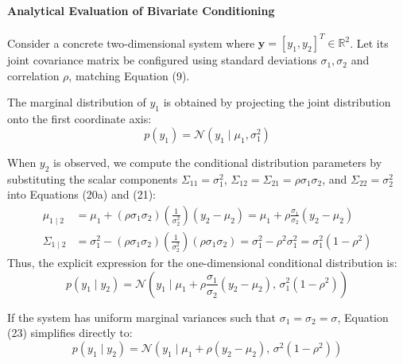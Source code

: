 \documentclass{article}
\begin{document}
\paragraph{Analytical Evaluation of Bivariate Conditioning}
Consider a concrete two-dimensional system where $\mathbf{y} = [y_1, y_2]^T \in \mathbb{R}^2$. Let its joint covariance matrix be configured using standard deviations $\sigma_1, \sigma_2$ and correlation $\rho$, matching Equation (9). 

The marginal distribution of $y_1$ is obtained by projecting the joint distribution onto the first coordinate axis:
\begin{equation}
p(y_1) = \mathcal{N}(y_1 \mid \mu_1, \sigma_1^2) \tag{22}
\end{equation}

When $y_2$ is observed, we compute the conditional distribution parameters by substituting the scalar components $\Sigma_{11} = \sigma_1^2$, $\Sigma_{12} = \Sigma_{21} = \rho\sigma_1\sigma_2$, and $\Sigma_{22} = \sigma_2^2$ into Equations (20a) and (21):
\begin{align*}
\mu_{1\mid2} &= \mu_1 + (\rho\sigma_1\sigma_2)\left(\frac{1}{\sigma_2^2}\right)(y_2 - \mu_2) = \mu_1 + \rho\frac{\sigma_1}{\sigma_2}(y_2 - \mu_2) \\
\Sigma_{1\mid2} &= \sigma_1^2 - (\rho\sigma_1\sigma_2)\left(\frac{1}{\sigma_2^2}\right)(\rho\sigma_1\sigma_2) = \sigma_1^2 - \rho^2\sigma_1^2 = \sigma_1^2(1 - \rho^2)
\end{align*}
Thus, the explicit expression for the one-dimensional conditional distribution is:
\begin{equation}
p(y_1 \mid y_2) = \mathcal{N}\left(y_1 \mid \mu_1 + \rho\frac{\sigma_1}{\sigma_2}(y_2 - \mu_2), \, \sigma_1^2(1 - \rho^2)\right) \tag{23}
\end{equation}

If the system has uniform marginal variances such that $\sigma_1 = \sigma_2 = \sigma$, Equation (23) simplifies directly to:
\begin{equation}
p(y_1 \mid y_2) = \mathcal{N}\left(y_1 \mid \mu_1 + \rho(y_2 - \mu_2), \, \sigma^2(1 - \rho^2)\right) \tag{24}
\end{equation}
\end{document}
